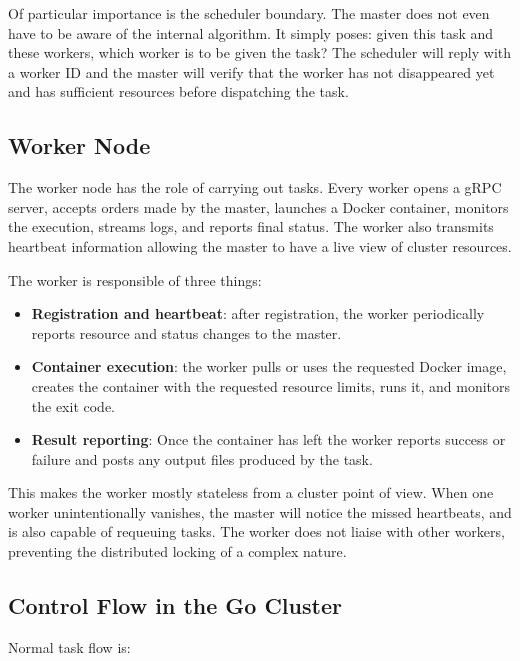 Of particular importance is the scheduler boundary. The master does not even have to be aware of the internal algorithm. It simply poses: given this task and these workers, which worker is to be given the task? The scheduler will reply with a worker ID and the master will verify that the worker has not disappeared yet and has sufficient resources before dispatching the task.

\subsection{Worker Node}

The worker node has the role of carrying out tasks. Every worker opens a gRPC server, accepts orders made by the master, launches a Docker container, monitors the execution, streams logs, and reports final status. The worker also transmits heartbeat information allowing the master to have a live view of cluster resources.

The worker is responsible of three things:

\begin{itemize}
    \item \textbf{Registration and heartbeat}: after registration, the worker periodically reports resource and status changes to the master.
    \item \textbf{Container execution}: the worker pulls or uses the requested Docker image, creates the container with the requested resource limits, runs it, and monitors the exit code.
    \item \textbf{Result reporting}: Once the container has left the worker reports success or failure and posts any output files produced by the task.
\end{itemize}

This makes the worker mostly stateless from a cluster point of view. When one worker unintentionally vanishes, the master will notice the missed heartbeats, and is also capable of requeuing tasks. The worker does not liaise with other workers, preventing the distributed locking of a complex nature.

\subsection{Control Flow in the Go Cluster}

Normal task flow is:

